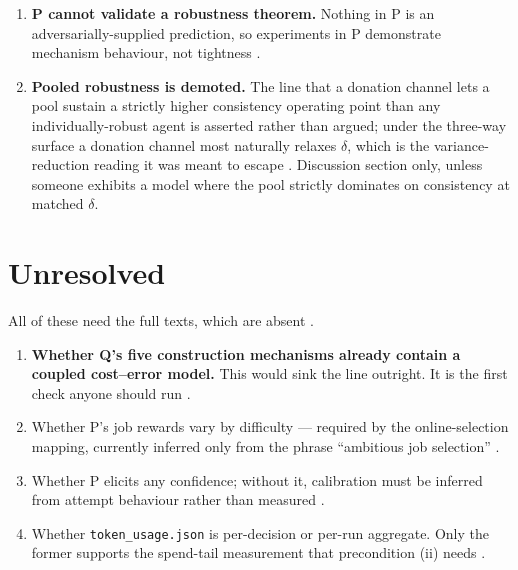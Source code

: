 \documentclass{article}
\begin{document}
\begin{enumerate}
        This objection is correct and I adopt it, with one clarification that narrows its
        reach. It bites on the strong reading of P's control --- that a better predictor is
        net-negative  --- which must not be asserted until the deficit is
        shown to survive rescaling of \(R/p\). It does \emph{not} bite on precondition (ii)
        of the conjecture, which is a statement about the upper tail of the per-decision
        spend distribution alone and is invariant to how rewards are priced. So the
        theory's hypothesis survives the confound; the motivating empirical claim does not,
        until measured.
  \item \textbf{P cannot validate a robustness theorem.} Nothing in P is an
        adversarially-supplied prediction, so experiments in P demonstrate mechanism
        behaviour, not tightness .
  \item \textbf{Pooled robustness is demoted.} The line that a donation channel lets a pool
        sustain a strictly higher consistency operating point than any individually-robust
        agent  is asserted rather than argued; under the three-way surface a
        donation channel most naturally relaxes \(\delta\), which is the
        variance-reduction reading it was meant to escape . Discussion
        section only, unless someone exhibits a model where the pool strictly dominates on
        consistency at matched \(\delta\).
\end{enumerate}

\section{Unresolved}

All of these need the full texts, which are absent .

\begin{enumerate}
  \item \textbf{Whether Q's five construction mechanisms already contain a coupled
        cost--error model.} This would sink the line outright. It is the first check anyone
        should run .
  \item Whether P's job rewards vary by difficulty --- required by the online-selection
        mapping, currently inferred only from the phrase ``ambitious job selection''
        .
  \item Whether P elicits any confidence; without it, calibration must be inferred from
        attempt behaviour rather than measured .
  \item Whether \texttt{token\_usage.json} is per-decision or per-run aggregate. Only the
        former supports the spend-tail measurement that precondition (ii) needs
        .
\end{enumerate}
\end{document}
